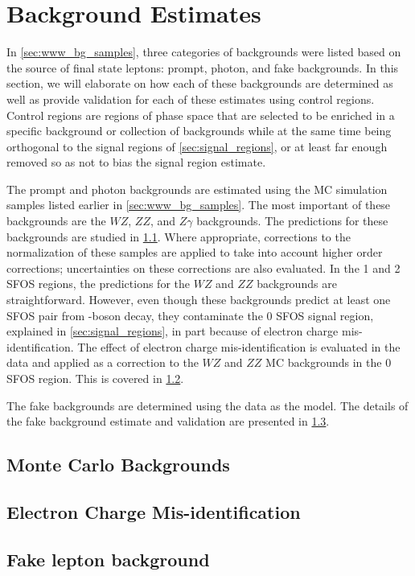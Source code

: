 \section{Background Estimates}
\label{sec:bg_estimates}

In \sec\ref{sec:www_bg_samples}, three categories of backgrounds
were listed based on the source
of final state leptons: prompt, photon, and fake
backgrounds. In this section, we will elaborate on how
each of these backgrounds are determined as well
as provide validation for each of these estimates using
control regions. Control regions are regions of phase space
that are selected to be enriched in a specific background
or collection of backgrounds while at the same time being
orthogonal to the signal regions of \sec\ref{sec:signal_regions},
or at least far enough removed so as not to bias the signal region
estimate.

The prompt and photon backgrounds are estimated using 
the MC simulation samples listed earlier in \sec\ref{sec:www_bg_samples}.
The most important of these backgrounds are the $WZ$, $ZZ$, 
and $Z\gamma$ backgrounds. The predictions for these backgrounds
are studied in \sec\ref{sec:mcbg}. Where appropriate, corrections
to the normalization
of these samples are applied to take into account higher order 
corrections; uncertainties on these corrections are also evaluated.
In the 1 and 2 SFOS regions, the predictions for the $WZ$ and $ZZ$
backgrounds are straightforward. 
However, even though these backgrounds predict
at least one SFOS pair from \z-boson decay,
they contaminate the 0 SFOS signal region,
explained in \sec\ref{sec:signal_regions}, in part because
of electron charge mis-identification.  The effect of 
electron charge mis-identification is evaluated in the data
and applied as a correction to the $WZ$ and $ZZ$ MC backgrounds
in the 0 SFOS region. This is covered in \sec\ref{sec:charge_misid}.

The fake backgrounds are determined 
using the data as the model. The details of the fake background
estimate and validation are presented in \sec\ref{sec:bg_fake}.





\subsection{Monte Carlo Backgrounds}
\label{sec:mcbg}

\subsection{Electron Charge Mis-identification}
\label{sec:charge_misid}
  
\subsection{Fake lepton background}
\label{sec:bg_fake}

